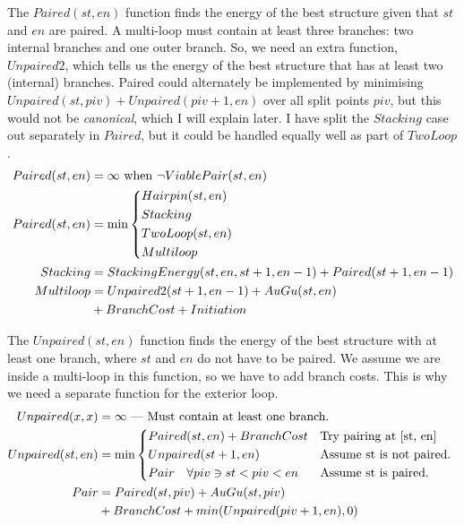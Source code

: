 \documentclass{cshonours}
\newcommand{\NOT}{\neg}
\begin{document}
The $Paired(st, en)$ function finds the energy of the best structure given that $st$ and $en$ are paired. A multi-loop must contain at least three branches: two internal branches and one outer branch. So, we need an extra function, $Unpaired2$, which tells us the energy of the best structure that has at least two (internal) branches. Paired could alternately be implemented by minimising $Unpaired(st, piv) + Unpaired(piv + 1, en)$ over all split points $piv$, but this would not be \emph{canonical}, which I will explain later. I have split the $Stacking$ case out separately in $Paired$, but it could be handled equally well as part of $TwoLoop$.
\begin{align*}
Paired(st, en) &= \infty \text{ when } \NOT ViablePair(st, en) \\
Paired(st, en) &= \min{\begin{dcases}
  Hairpin(st, en) \\
  Stacking \\
  TwoLoop(st, en) \\
  Multiloop \\
\end{dcases}} \\
Stacking &= StackingEnergy(st, en, st + 1, en - 1) + Paired(st + 1, en - 1) \\
Multiloop &= Unpaired2(st + 1, en - 1) + AuGu(st, en) \\
  &+ BranchCost + Initiation \\
\end{align*}

The $Unpaired(st, en)$ function finds the energy of the best structure with at least one branch, where $st$ and $en$ do not have to be paired. We assume we are inside a multi-loop in this function, so we have to add branch costs. This is why we need a separate function for the exterior loop.
\begin{align*} 
Unpaired(x, x) &= \infty \text{ --- Must contain at least one branch.} \\
Unpaired(st, en) &= \min{\begin{dcases*}
  Paired(st, en) + BranchCost & Try pairing at [st, en] \\
  Unpaired(st + 1, en) & Assume st is not paired. \\
  Pair \quad \forall piv \ni st < piv < en & Assume st is paired. \\
\end{dcases*}} \\
Pair &= Paired(st, piv) + AuGu(st, piv)  \\
  &+ BranchCost + min(Unpaired(piv + 1, en), 0) \\
\end{align*}
\end{document}
